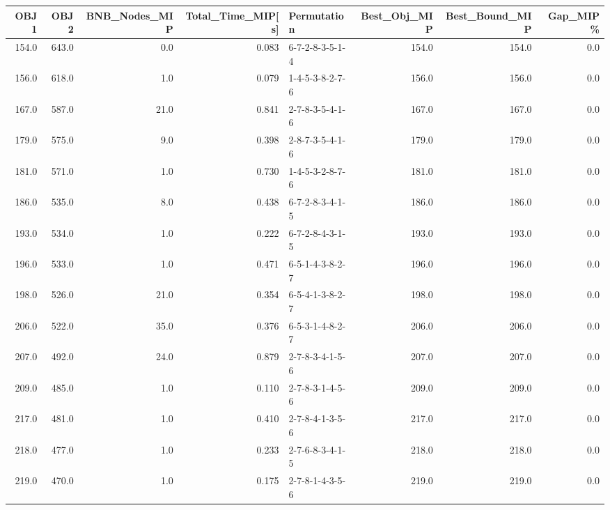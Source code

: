 \begin{tabular}{rrrrlrrr}
\toprule
  OBJ1 &   OBJ2 &  BNB\_Nodes\_MIP &  Total\_Time\_MIP[s] &      Permutation &  Best\_Obj\_MIP &  Best\_Bound\_MIP &  Gap\_MIP\% \\
\midrule
 154.0 &  643.0 &            0.0 &              0.083 &  6-7-2-8-3-5-1-4 &         154.0 &           154.0 &       0.0 \\
 156.0 &  618.0 &            1.0 &              0.079 &  1-4-5-3-8-2-7-6 &         156.0 &           156.0 &       0.0 \\
 167.0 &  587.0 &           21.0 &              0.841 &  2-7-8-3-5-4-1-6 &         167.0 &           167.0 &       0.0 \\
 179.0 &  575.0 &            9.0 &              0.398 &  2-8-7-3-5-4-1-6 &         179.0 &           179.0 &       0.0 \\
 181.0 &  571.0 &            1.0 &              0.730 &  1-4-5-3-2-8-7-6 &         181.0 &           181.0 &       0.0 \\
 186.0 &  535.0 &            8.0 &              0.438 &  6-7-2-8-3-4-1-5 &         186.0 &           186.0 &       0.0 \\
 193.0 &  534.0 &            1.0 &              0.222 &  6-7-2-8-4-3-1-5 &         193.0 &           193.0 &       0.0 \\
 196.0 &  533.0 &            1.0 &              0.471 &  6-5-1-4-3-8-2-7 &         196.0 &           196.0 &       0.0 \\
 198.0 &  526.0 &           21.0 &              0.354 &  6-5-4-1-3-8-2-7 &         198.0 &           198.0 &       0.0 \\
 206.0 &  522.0 &           35.0 &              0.376 &  6-5-3-1-4-8-2-7 &         206.0 &           206.0 &       0.0 \\
 207.0 &  492.0 &           24.0 &              0.879 &  2-7-8-3-4-1-5-6 &         207.0 &           207.0 &       0.0 \\
 209.0 &  485.0 &            1.0 &              0.110 &  2-7-8-3-1-4-5-6 &         209.0 &           209.0 &       0.0 \\
 217.0 &  481.0 &            1.0 &              0.410 &  2-7-8-4-1-3-5-6 &         217.0 &           217.0 &       0.0 \\
 218.0 &  477.0 &            1.0 &              0.233 &  2-7-6-8-3-4-1-5 &         218.0 &           218.0 &       0.0 \\
 219.0 &  470.0 &            1.0 &              0.175 &  2-7-8-1-4-3-5-6 &         219.0 &           219.0 &       0.0 \\

\end{tabular}
